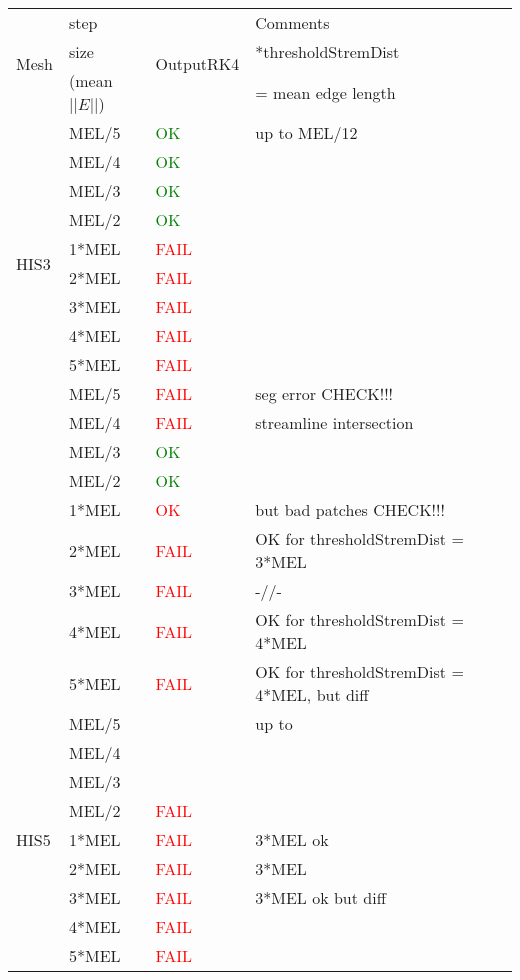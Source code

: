 \documentclass{article}
\begin{document}

	\begin{tabular}{ |l|l|l|l| }
\hline
\multirow{3}{*}{Mesh} & step  & \multirow{3}{*}{OutputRK4}  & Comments \\
 & size & &*thresholdStremDist  \\
 & (mean $||E||$) & &= mean edge length \\ \hline
 

 
\multirow{10}{*}{HIS3} & MEL/5 & \textcolor{green}{OK}& up to MEL/12\\ 
& MEL/4 & \textcolor{green}{OK} &  \\
 & MEL/3 &  \textcolor{green}{ OK} &  \\
 & MEL/2 &  \textcolor{green}{ OK} & \\
 & 1*MEL &    \textcolor{red}{FAIL } & \\ 
 & 2*MEL & \textcolor{red}{FAIL } & \\
 & 3*MEL &  \textcolor{red}{FAIL } & \\
 & 4*MEL &  \textcolor{red}{FAIL} & \\
 & 5*MEL &    \textcolor{red}{FAIL} & \\ \hline
 
\multirow{10}{*}{HIS4} & MEL/5 & \textcolor{red}{FAIL }& seg error CHECK!!! \\ 
& MEL/4 & \textcolor{red}{FAIL } & streamline intersection  \\
 & MEL/3 &  \textcolor{green}{ OK} &   \\
 & MEL/2 &  \textcolor{green}{OK } &  \\
 & 1*MEL &    \textcolor{red}{OK } &but bad patches CHECK!!! \\ 
 & 2*MEL & \textcolor{red}{FAIL } & OK for thresholdStremDist = 3*MEL \\
 & 3*MEL &  \textcolor{red}{FAIL } & -//- \\
 & 4*MEL &  \textcolor{red}{ FAIL} & OK for thresholdStremDist = 4*MEL\\
 & 5*MEL &    \textcolor{red}{ FAIL} & OK for thresholdStremDist = 4*MEL, but diff\\ \hline 
 
 \multirow{10}{*}{HIS5} & MEL/5 & \textcolor{green}{ }& up to   \\ 
& MEL/4 & \textcolor{green}{ } &   \\
 & MEL/3 &  \textcolor{green}{ } &   \\
 & MEL/2 &  \textcolor{red}{ FAIL} &  \\
 & 1*MEL &    \textcolor{red}{FAIL } & 3*MEL  ok \\
 & 2*MEL & \textcolor{red}{ FAIL} & 3*MEL\\
 & 3*MEL &  \textcolor{red}{ FAIL} & 3*MEL  ok but diff\\
 & 4*MEL &  \textcolor{red}{ FAIL} & \\
 & 5*MEL &    \textcolor{red}{ FAIL} & \\ \hline

\end{tabular}
\end{document}
